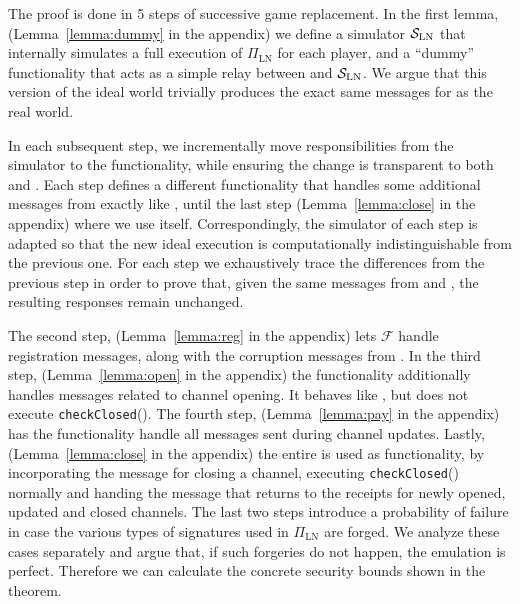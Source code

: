   \begin{proofsketch}
    The proof is done in 5 steps of successive game replacement. In
    the first lemma, (Lemma~\ref{lemma:dummy} in the appendix) we
    define a simulator $\mathcal{S}_{\mathrm{LN}}$
    that internally simulates a full execution of $\Pi_{\mathrm{LN}}$ for each
    player, and a ``dummy'' functionality that acts as a simple relay between
    \environment{} and $\mathcal{S}_{\mathrm{LN}}$. We argue that this version of
    the ideal world trivially produces the exact same messages for
    \environment{} as the real world.

    In each subsequent step, we incrementally move responsibilities from the
    simulator to the functionality, while ensuring the change is
    transparent to both \environment{} and \adversary. Each step defines a
    different functionality that handles some additional messages from
    \environment{} exactly like \fpaynet, until the last step
    (Lemma~\ref{lemma:close} in the appendix) where we use \fpaynet{} itself. Correspondingly,
    the simulator of each step is adapted so that the new ideal execution is
    computationally indistinguishable from the previous one. For each
    step we exhaustively trace the differences from the previous step in order
    to prove that, given the same messages from \environment{} and \adversary{},
    the resulting responses remain unchanged.

    The second step, (Lemma~\ref{lemma:reg} in the appendix) lets $\mathcal{F}$ handle registration messages,
    along with the corruption messages from \simulator. In the third
    step,  (Lemma~\ref{lemma:open} in the appendix)
    the functionality additionally handles messages related to channel opening. It
    behaves like \fpaynet, but does not execute \texttt{checkClosed}().
    The fourth step, (Lemma~\ref{lemma:pay} in the appendix) has the functionality handle all messages sent during
    channel updates. Lastly, (Lemma~\ref{lemma:close} in the appendix)
    the entire \fpaynet{} is used as functionality, by incorporating the message for closing a channel,
    executing \texttt{checkClosed}() normally and handing the message that returns
    to \environment{} the receipts for newly opened, updated and closed
    channels. The last two steps introduce a probability of failure in case
    the various types of signatures used in  $\Pi_{\mathrm{LN}}$ are forged. We analyze these cases separately and argue that, if
    such forgeries do not happen, the emulation is perfect. Therefore we can
    calculate the concrete security bounds shown in the theorem.
  \end{proofsketch}
